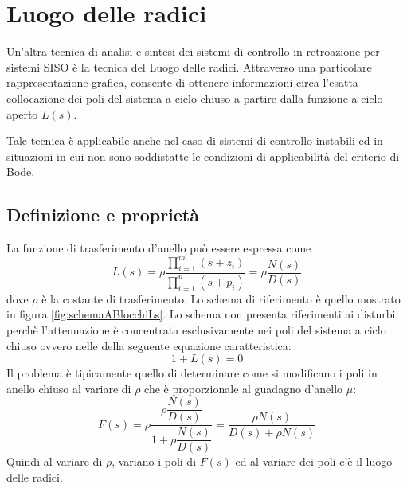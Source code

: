\documentclass[a4paper]{report}
\begin{document}
\chapter{Luogo delle radici}
Un'altra tecnica di analisi e sintesi dei sistemi di controllo in
retroazione per sistemi SISO \`e la tecnica del Luogo delle
radici. Attraverso una particolare rappresentazione grafica, consente
di ottenere informazioni circa l'esatta collocazione dei poli del
sistema a ciclo chiuso a partire dalla funzione a ciclo aperto $L(s)$.

Tale tecnica \`e applicabile anche nel caso di sistemi di controllo
instabili ed in situazioni in cui non sono soddistatte le condizioni
di applicabilit\`a del criterio di Bode.

\section{Definizione e propriet\`a}

La funzione di trasferimento d'anello pu\`o essere espressa come
\begin{equation}\label{eq:luogoRadiciLs}
L(s) = \rho \dfrac{\prod\limits_{i = 1}^{m} (s + z_i)}{\prod\limits_{i = 1}^{n} (s +
  p_i)} = \rho \dfrac{N(s)}{D(s)}
\end{equation}
dove $\rho$ \`e la costante di trasferimento. Lo schema di riferimento
\`e quello mostrato in figura \ref{fig:schemaABlocchiLs}. Lo schema
non presenta riferimenti ai disturbi perch\`e l'attenuazione \`e
concentrata esclusivamente nei poli del sistema a ciclo chiuso ovvero
nelle della seguente equazione caratteristica:
\begin{equation}
  1 + L(s) = 0
\end{equation}
Il problema \`e tipicamente quello di determinare come si modificano i
poli in anello chiuso al variare di $\rho$ che \`e proporzionale al
guadagno d'anello $\mu$:
\[
F(s) = \rho \dfrac{\rho \dfrac{N(s)}{D(s)}}{1 + \rho
  \dfrac{N(s)}{D(s)}} = \dfrac{\rho N(s)}{D(s) + \rho N(s)}
\]
Quindi al variare di $\rho$, variano i poli di $F(s)$ ed al variare
dei poli c'\`e il luogo delle radici.
\end{document}
